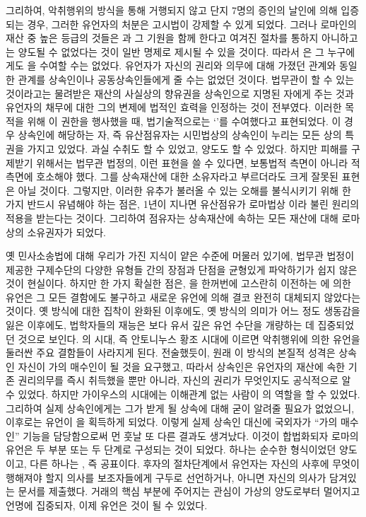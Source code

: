 그리하여,
악취행위의 방식을 통해 거행되지 않고
단지 7명의 증인의 날인에 의해 입증되는 경우,
그러한 유언자의 처분은 고시법이 강제할 수 있게 되었다.
그러나
로마인의 재산 중 높은 등급의 것들은
과 그 기원을 함께 한다고 여겨진 절차를 통하지 아니하고는
양도될 수 없었다는 것이 일반 명제로 제시될 수 있을 것이다.
따라서 은 그 누구에게도 을 수여할 수는 없었다.
유언자가 자신의 권리와 의무에 대해 가졌던 관계와 동일한 관계를
상속인이나 공동상속인들에게 줄 수는 없었던 것이다.
법무관이 할 수 있는 것이라고는
물려받은 재산의 사실상의 향유권을
상속인으로 지명된 자에게
주는 것과
유언자의 채무에 대한 그의 변제에 법적인 효력을 인정하는 것이
전부였다.
이러한 목적을 위해 이 권한을 행사했을 때,
법기술적으로는
`'를 수여했다고
표현되었다.
이 경우 상속인에 해당하는 자, 즉 유산점유자는
시민법상의 상속인이 누리는 모든 상의 특권을 가지고 있었다.
과실 수취도 할 수 있었고, 양도도 할 수 있었다.
하지만 피해를 구제받기 위해서는 법무관 법정의,
이런 표현을 쓸 수 있다면, 보통법적 측면이 아니라
적 측면에 호소해야 했다.
%
그를 상속재산에 대한  소유자라고
부르더라도 크게 잘못된 표현은 아닐 것이다.
그렇지만,
이러한 유추가 불러올 수 있는 오해를 불식시키기 위해
한 가지 반드시 유념해야 하는 점은,
1년이 지나면
유산점유가
로마법상 이라 불린 원리의 적용을 받는다는 것이다.
그리하여
점유자는 상속재산에 속하는 모든 재산에 대해
로마상의 소유권자가 되었다.

옛 민사소송법에 대해 우리가 가진 지식이 얕은 수준에 머물러 있기에,
법무관 법정이 제공한 구제수단의 다양한 유형들 간의 장점과 단점을
균형있게 파악하기가 쉽지 않은 것이 현실이다.
하지만 한 가지 확실한 점은,
을 한꺼번에 고스란히 이전하는 에 의한 유언은
그 모든 결함에도 불구하고
새로운 유언에 의해 결코 완전히 대체되지 않았다는 것이다.
옛 방식에 대한 집착이 완화된 이후에도,
옛 방식의 의미가 어느 정도 생동감을 잃은 이후에도,
법학자들의 재능은 보다 유서 깊은 유언 수단을 개량하는 데
집중되었던 것으로 보인다.
의 시대, 즉 안토니누스 황조 시대에 이르면
악취행위에 의한 유언을 둘러싼 주요 결함들이 사라지게 된다.
전술했듯이, 원래 이 방식의 본질적 성격은
상속인 자신이 가의 매수인이 될 것을 요구했고,
따라서 상속인은
유언자의 재산에 속한 기존 권리의무를 즉시 취득했을 뿐만 아니라,
자신의 권리가 무엇인지도 공식적으로 알 수 있었다.
하지만 가이우스의 시대에는
이해관계 없는 사람이 의 역할을 할 수 있었다.
그리하여 실제 상속인에게는 그가 받게 될 상속에 대해 굳이 알려줄 필요가 없었으니,
이후로는 유언이 을 획득하게 되었다.
이렇게 실제 상속인 대신에 국외자가 ``가의 매수인'' 기능을 담당함으로써
먼 훗날 또 다른 결과도 생겨났다.
이것이 합법화되자 로마의 유언은 두 부분 또는 두 단계로
구성되는 것이 되었다.
하나는 순수한 형식이었던 양도이고,
다른 하나는 , 즉 공표이다.
후자의 절차단계에서 유언자는
자신의 사후에 무엇이 행해져야 할지 의사를 보조자들에게 구두로 선언하거나,
아니면 자신의 의사가 담겨있는 문서를 제출했다.
거래의 핵심 부분에 주어지는 관심이
가상의 양도로부터 멀어지고
언명에 집중되자,
이제 유언은  것이 될 수 있었다.

